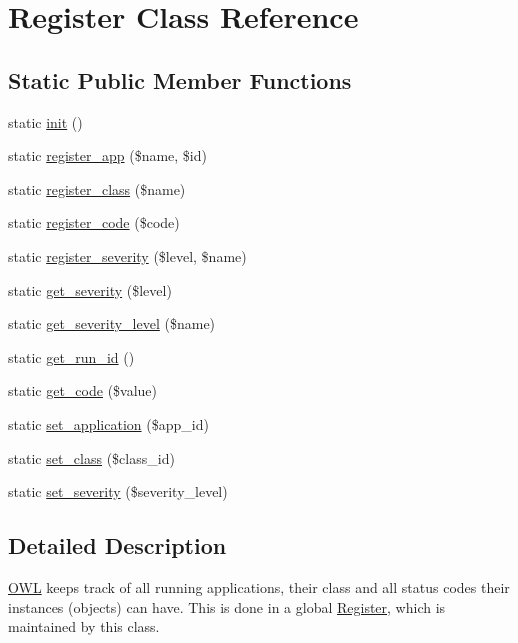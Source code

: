 \section{Register Class Reference}
\label{classRegister}
\subsection*{Static Public Member Functions}
\begin{DoxyCompactItemize}
\item 
static \hyperlink{classRegister_a5c34c30e9e6ce4dea2dbb02f55e9278a}{init} ()
\item 
static \hyperlink{classRegister_ac547568c4a7272fdaf65cb2825eccec3}{register\_\-app} (\$name, \$id)
\item 
static \hyperlink{classRegister_a58300f74d002f1306a03baf12af0f02c}{register\_\-class} (\$name)
\item 
static \hyperlink{classRegister_a875fd1f32f0746aa9e0e00b053c7389a}{register\_\-code} (\$code)
\item 
static \hyperlink{classRegister_ac22a104eefa471675cb28ee20821eaad}{register\_\-severity} (\$level, \$name)
\item 
static \hyperlink{classRegister_ae71e10bddb03483b54ad22b9edb95b7c}{get\_\-severity} (\$level)
\item 
static \hyperlink{classRegister_a70490e59a4a3b910d259b8a4287c3e91}{get\_\-severity\_\-level} (\$name)
\item 
static \hyperlink{classRegister_a041706fafb409a31f125d2075501e82e}{get\_\-run\_\-id} ()
\item 
static \hyperlink{classRegister_a363389530273f40c3b20666bbff75e05}{get\_\-code} (\$value)
\item 
static \hyperlink{classRegister_ad4d61787414f7d64d1e3420f0fdf3f91}{set\_\-application} (\$app\_\-id)
\item 
static \hyperlink{classRegister_a58e49ccb1fe4e441d0329e879c922aa0}{set\_\-class} (\$class\_\-id)
\item 
static \hyperlink{classRegister_a0adde8d67d77b9b4d66156272cb48ae4}{set\_\-severity} (\$severity\_\-level)
\end{DoxyCompactItemize}


\subsection{Detailed Description}
\hyperlink{classOWL}{OWL} keeps track of all running applications, their class and all status codes their instances (objects) can have. This is done in a global \hyperlink{classRegister}{Register}, which is maintained by this class. 

